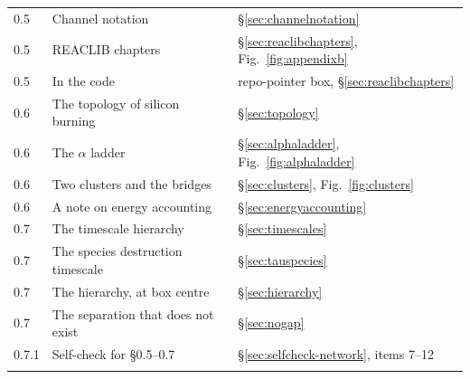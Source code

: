\begin{longtable}{@{}p{3.0cm} p{7.3cm} >{\raggedright\arraybackslash}p{5.2cm}@{}}
0.5   & Channel notation & \S\ref{sec:channelnotation} \\
0.5   & REACLIB chapters & \S\ref{sec:reaclibchapters},
        Fig.~\ref{fig:appendixb} \\
0.5   & In the code & repo-pointer box, \S\ref{sec:reaclibchapters} \\
0.6   & The topology of silicon burning & \S\ref{sec:topology} \\
0.6   & The $\alpha$ ladder & \S\ref{sec:alphaladder},
        Fig.~\ref{fig:alphaladder} \\
0.6   & Two clusters and the bridges & \S\ref{sec:clusters},
        Fig.~\ref{fig:clusters} \\
0.6   & A note on energy accounting & \S\ref{sec:energyaccounting} \\
0.7   & The timescale hierarchy & \S\ref{sec:timescales} \\
0.7   & The species destruction timescale & \S\ref{sec:tauspecies} \\
0.7   & The hierarchy, at box centre & \S\ref{sec:hierarchy} \\
0.7   & The separation that does not exist & \S\ref{sec:nogap} \\
0.7.1 & Self-check for \S0.5--0.7 &
        \S\ref{sec:selfcheck-network}, items 7--12 \\
\addlinespace


\end{longtable}
